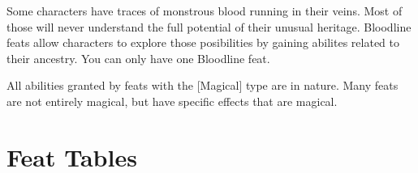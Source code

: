      Some characters have traces of monstrous blood running in their veins.
    Most of those will never understand the full potential of their unusual heritage.
    Bloodline feats allow characters to explore those posibilities by gaining abilites related to their ancestry.
    You can only have one Bloodline feat.

    All abilities granted by feats with the [Magical] type are  in nature.
    Many feats are not entirely magical, but have specific effects that are magical.

\section{Feat Tables}

